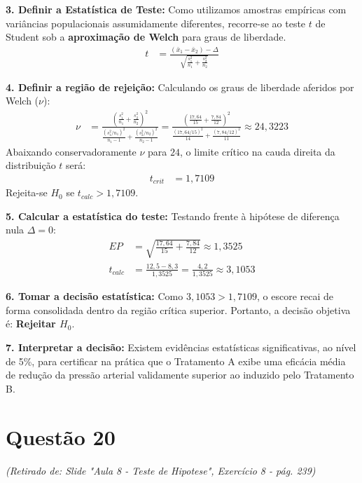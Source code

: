 \documentclass[12pt, a4paper]{article}
\begin{document}
\noindent \textbf{3. Definir a Estatística de Teste:}
Como utilizamos amostras empíricas com variâncias populacionais assumidamente diferentes, recorre-se ao teste $t$ de Student sob a \textbf{aproximação de Welch} para graus de liberdade.
\begin{align*}
t &= \frac{(\bar{x}_1 - \bar{x}_2) - \Delta}{\sqrt{\frac{s^2_1}{n_1} + \frac{s^2_2}{n_2}}}
\end{align*}

\noindent \textbf{4. Definir a região de rejeição:}
Calculando os graus de liberdade aferidos por Welch ($\nu$):
\begin{align*}
\nu &= \frac{\left(\frac{s^2_1}{n_1} + \frac{s^2_2}{n_2}\right)^2}{\frac{(s^2_1/n_1)^2}{n_1-1} + \frac{(s^2_2/n_2)^2}{n_2-1}} = \frac{\left(\frac{17{,}64}{15} + \frac{7{,}84}{12}\right)^2}{\frac{(17{,}64/15)^2}{14} + \frac{(7{,}84/12)^2}{11}} \approx \boxed{24{,}3223}
\end{align*}
Abaixando conservadoramente $\nu$ para $24$, o limite crítico na cauda direita da distribuição $t$ será:
\begin{align*}
t_{crit} &= \boxed{1{,}7109}
\end{align*}
Rejeita-se $H_0$ se $t_{calc} > 1{,}7109$.

\noindent \textbf{5. Calcular a estatística do teste:}
Testando frente à hipótese de diferença nula $\Delta = 0$:
\begin{align*}
EP &= \sqrt{\frac{17{,}64}{15} + \frac{7{,}84}{12}} \approx \boxed{1{,}3525} \\
t_{calc} &= \frac{12{,}5 - 8{,}3}{1{,}3525} = \frac{4{,}2}{1{,}3525} \approx \boxed{3{,}1053}
\end{align*}

\noindent \textbf{6. Tomar a decisão estatística:}
Como $3{,}1053 > 1{,}7109$, o escore recai de forma consolidada dentro da região crítica superior. Portanto, a decisão objetiva é: \textbf{Rejeitar $H_0$}.

\noindent \textbf{7. Interpretar a decisão:}
Existem evidências estatísticas significativas, ao nível de 5\%, para certificar na prática que o Tratamento A exibe uma eficácia média de redução da pressão arterial validamente superior ao induzido pelo Tratamento B.

\section*{Questão 20}
\textit{(Retirado de: Slide "Aula 8 - Teste de Hipotese", Exercício 8 - pág. 239)}
\end{document}
